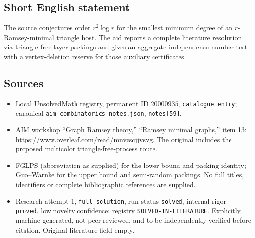 \documentclass[11pt]{article}
\begin{document}
\subsection{Short English statement}
The source conjectures order $r^2\log r$ for the smallest minimum degree of an $r$-Ramsey-minimal triangle host. The aid reports a complete literature resolution via triangle-free layer packings and gives an aggregate independence-number test with a vertex-deletion reserve for those auxiliary certificates.
\subsection{Sources}
\begin{itemize}
\item Local UnsolvedMath registry, permanent ID $20000935$, \texttt{catalogue entry}; canonical \texttt{aim-combinatorics-notes.json}, \texttt{notes[59]}.
\item AIM workshop ``Graph Ramsey theory,'' ``Ramsey minimal graphs,'' item 13: \url{https://www.overleaf.com/read/mnvcscjjysvg}. The original includes the proposed multicolor triangle-free-process route.
\item FGLPS (abbreviation as supplied) for the lower bound and packing identity; Guo--Warnke for the upper bound and semi-random packings. No full titles, identifiers or complete bibliographic references are supplied.
\item Research attempt 1, \texttt{full\_solution}, run status \texttt{solved}, internal rigor \texttt{proved}, low novelty confidence; registry \texttt{SOLVED-IN-LITERATURE}. Explicitly machine-generated, not peer reviewed, and to be independently verified before citation. Original literature field empty.
\end{itemize}
\end{document}
